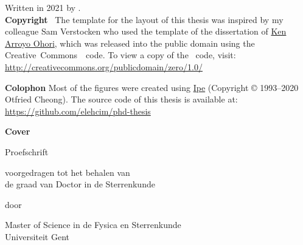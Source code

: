 
% 

\maketitle

\clearpage
\thispagestyle{empty}
\null%
\label{thesis:colophon}
\vfill
{}
Written in 2021 by {\makeatletter{\@author}\makeatother}.\\
\textbf{Copyright}~\cczero{} The template for the layout of this thesis was inspired by my colleague Sam Verstocken who used the template of the dissertation of \href{ken.mx}{Ken Arroyo Ohori},
which was released into the public domain using the Creative~Commons~\cczero{}~code.
To view a copy of the \cczero{}~code, visit:\\\url{http://creativecommons.org/publicdomain/zero/1.0/}

\textbf{Colophon}
Most of the figures were created using \href{http://ipe.otfried.org/}{Ipe} (Copyright © 1993–2020 Otfried Cheong).
The source code of this thesis is available at: \\
\url{https://github.com/elehcim/phd-thesis}

\textbf{Cover}


\begin{titlepage}
\null%
\label{thesis:title}
\vspace{3em}%
\begin{center}

\vspace*{4\baselineskip}

\makeatletter
{\huge\@title}
\makeatother
\vfill

{\Large Proefschrift}

\medskip

{voorgedragen tot het behalen van \\
de graad van
Doctor in de Sterrenkunde}


\medskip

door

\medskip

\makeatletter
{\Large \@author}
\makeatother

\medskip

Master of Science in de Fysica en  Sterrenkunde \\
Universiteit Gent

\end{center}
\end{titlepage}

